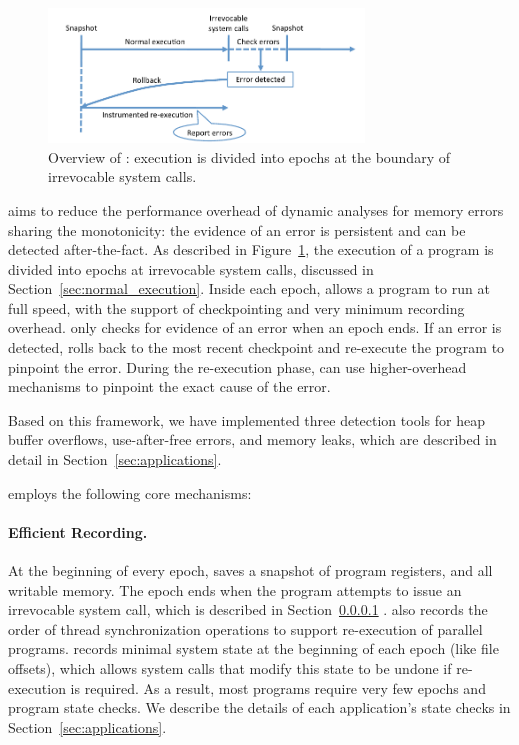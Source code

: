 \label{sec:overview}

\begin{figure}[!t]
\begin{center}
\includegraphics[width=3.3in]{doubletake/figure/overview}
\end{center}
\caption{
Overview of \doubletake{}: execution is divided into epochs at the boundary of irrevocable system calls. 
\label{fig:overview}}
\end{figure}

\doubletake{} aims to reduce the performance overhead of dynamic analyses for memory errors sharing the monotonicity: the evidence of an error is persistent and can be detected after-the-fact. As described in Figure~\ref{fig:overview}, the execution of a program is divided into epochs at irrevocable system calls, discussed in Section~\ref{sec:normal_execution}. Inside each epoch, \doubletake{} allows a program to run at full speed, with the support of checkpointing and very minimum recording overhead. \doubletake{} only checks for evidence of an error when an epoch ends. If an error is detected, \doubletake{} rolls back to the most recent checkpoint and re-execute the program to pinpoint the error.  During the re-execution phase, \doubletake{} can use higher-overhead mechanisms to pinpoint the exact cause of the error. 

Based on this framework, we have implemented three detection tools for heap buffer overflows, use-after-free errors, and memory leaks, which are described in detail in Section~\ref{sec:applications}. 

\doubletake{} employs the following core mechanisms:

\paragraph{Efficient Recording.}
At the beginning of every epoch, \doubletake{} saves a snapshot of program registers, and all writable memory. The epoch ends when the program attempts to issue an irrevocable system call, which is described in Section~\ref{} . \doubletake{} also records the order of thread synchronization operations to support re-execution of parallel programs. \doubletake{} records minimal system state at the beginning of each epoch (like file offsets), which allows system calls that modify this state to be undone if re-execution is required. As a result, most programs require very few epochs and program state checks. We describe the details of each application's state checks in Section~\ref{sec:applications}.

